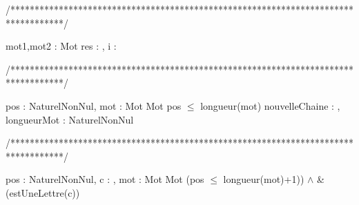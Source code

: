 /***********************************************************************************/
\begin{algorithme}
     {mot1,mot2 : Mot}%
     {\booleen}%
     {res : \booleen, i : \entier }%
     {
                  {
                  }%
                  {
                    {
                       {
                       }
                       
                       
                    }
                   }%
      
      }
\end{algorithme}

/***********************************************************************************/
\begin{algorithme}
       {pos : NaturelNonNul, mot : Mot}
       {Mot}
       {pos $\leq$ longueur(mot)}
       {nouvelleChaine : \chaine, longueurMot : NaturelNonNul}
       {
             {
             }
        }
       
\end{algorithme}

/***********************************************************************************/
\begin{algorithme}
       {pos : NaturelNonNul, c : \caractere, mot : Mot}%
       {Mot}%
       {(pos $\leq$ longueur(mot)+1)) $\land$ \& (estUneLettre(c))}%
       {}
       {
                {
                }
       }
\end{algorithme}

